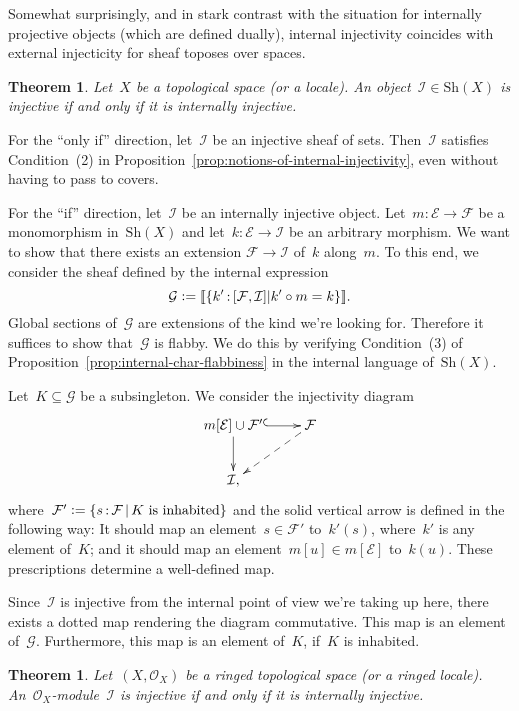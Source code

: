 \documentclass[10pt,reqno,a4paper]{amsbook}
\makeatletter
\theoremstyle{definition}
\theoremstyle{plain}
\newtheorem{thm}[defn]{Theorem}
\theoremstyle{remark}
\newcommand{\E}{\mathcal{E}}
\newcommand{\F}{\mathcal{F}}
\renewcommand{\G}{\mathcal{G}}
\renewcommand{\O}{\mathcal{O}}
\newcommand{\I}{\mathcal{I}}
\newcommand{\Sh}{\mathrm{Sh}}
\newcommand{\?}{\,{:}\,}
\renewcommand{\_}{\mathpunct{.}\,}
\newcommand{\brak}[1]{{\llbracket{#1}\rrbracket}}
\newcommand{\defeq}{\vcentcolon=}
\renewenvironment{proof}[1][\proofname]{\par
  \pushQED{\qed}%
  \normalfont \topsep6\p@\@plus6\p@\relax
  \trivlist
  \item[\hskip\labelsep
        \itshape
    #1\@addpunct{.}]\ignorespaces
}{%
  \popQED\endtrivlist\@endpefalse
}
\makeatother
\begin{document}
Somewhat surprisingly, and in stark contrast with the situation for internally
projective objects (which are defined dually), internal injectivity coincides
with external injecticity for sheaf toposes over spaces.

\begin{thm}\label{thm:char-injectivity}
Let~$X$ be a topological space (or a locale). An object~$\I \in \Sh(X)$ is
injective if and only if it is internally injective.
\end{thm}

\begin{proof}For the ``only if'' direction, let~$\I$ be an injective sheaf of
sets. Then~$\I$ satisfies Condition~(2) in
Proposition~\ref{prop:notions-of-internal-injectivity}, even without having to
pass to covers.

For the ``if'' direction, let~$\I$ be an internally injective object. Let~$m :
\E \to \F$ be a monomorphism in~$\Sh(X)$ and let~$k : \E \to \I$ be an arbitrary
morphism. We want to show that there exists an extension $\F \to \I$ of~$k$
along~$m$. To this end, we consider the sheaf defined by the internal expression
\[ \G \defeq \brak{\{ k' \? [\F,\I] | k' \circ m = k \}}. \]
Global sections of~$\G$ are extensions of the kind we're looking for.
Therefore it suffices to show that~$\G$ is flabby. We do this by verifying
Condition~(3) of Proposition~\ref{prop:internal-char-flabbiness} in the internal
language of~$\Sh(X)$.

Let~$K \subseteq \G$ be a subsingleton. We consider the injectivity diagram
\[ \xymatrix{
  m[\E] \cup \F' \ar@{^{(}->}[r]\ar[d] & \F \ar@{-->}[ld] \\
  \I,
} \]
where~$\F' \defeq \{ s \? \F \,|\, \text{$K$ is inhabited} \}$ and the solid
vertical arrow is defined in the following way: It should map an element~$s \in
\F'$ to~$k'(s)$, where~$k'$ is any element of~$K$; and it should map an
element~$m[u] \in m[\E]$ to~$k(u)$. These prescriptions determine a well-defined
map.

Since~$\I$ is injective from the internal point of view we're taking up here,
there exists a dotted map rendering the diagram commutative. This map is an
element of~$\G$. Furthermore, this map is an element of~$K$, if~$K$ is
inhabited.
\end{proof}

\begin{thm}\label{thm:char-injectivity-modules}
Let~$(X,\O_X)$ be a ringed topological space (or a ringed locale).
An~$\O_X$-module~$\I$ is injective if and only if it is internally injective.
\end{thm}
\end{document}
